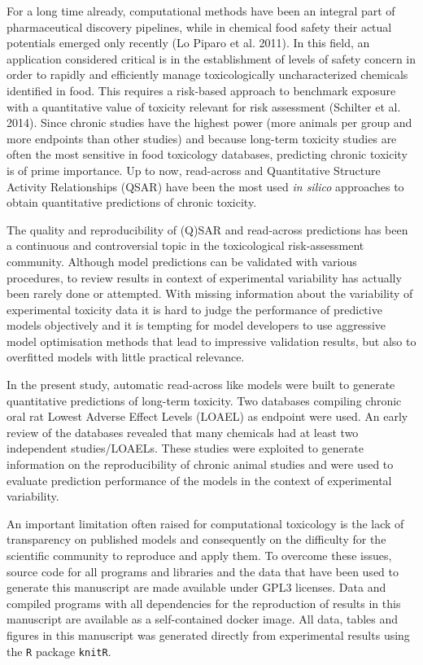 \documentclass[]{achemso}
\begin{document}
For a long time already, computational methods have been an integral
part of pharmaceutical discovery pipelines, while in chemical food
safety their actual potentials emerged only recently (Lo Piparo et al.
2011). In this field, an application considered critical is in the
establishment of levels of safety concern in order to rapidly and
efficiently manage toxicologically uncharacterized chemicals identified
in food. This requires a risk-based approach to benchmark exposure with
a quantitative value of toxicity relevant for risk assessment (Schilter
et al. 2014). Since chronic studies have the highest power (more animals
per group and more endpoints than other studies) and because long-term
toxicity studies are often the most sensitive in food toxicology
databases, predicting chronic toxicity is of prime importance. Up to
now, read-across and Quantitative Structure Activity Relationships
(QSAR) have been the most used \emph{in silico} approaches to obtain
quantitative predictions of chronic toxicity.

The quality and reproducibility of (Q)SAR and read-across predictions
has been a continuous and controversial topic in the toxicological
risk-assessment community. Although model predictions can be validated
with various procedures, to review results in context of experimental
variability has actually been rarely done or attempted. With missing
information about the variability of experimental toxicity data it is
hard to judge the performance of predictive models objectively and it is
tempting for model developers to use aggressive model optimisation
methods that lead to impressive validation results, but also to
overfitted models with little practical relevance.

In the present study, automatic read-across like models were built to
generate quantitative predictions of long-term toxicity. Two databases
compiling chronic oral rat Lowest Adverse Effect Levels (LOAEL) as
endpoint were used. An early review of the databases revealed that many
chemicals had at least two independent studies/LOAELs. These studies
were exploited to generate information on the reproducibility of chronic
animal studies and were used to evaluate prediction performance of the
models in the context of experimental variability.

An important limitation often raised for computational toxicology is the
lack of transparency on published models and consequently on the
difficulty for the scientific community to reproduce and apply them. To
overcome these issues, source code for all programs and libraries and
the data that have been used to generate this manuscript are made
available under GPL3 licenses. Data and compiled programs with all
dependencies for the reproduction of results in this manuscript are
available as a self-contained docker image. All data, tables and figures
in this manuscript was generated directly from experimental results
using the \texttt{R} package \texttt{knitR}.
\end{document}
